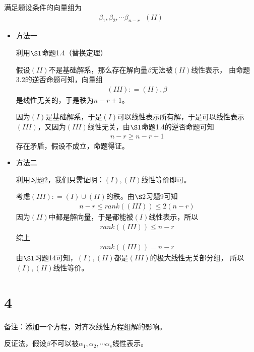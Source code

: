 \documentclass{article}
\begin{document}
满足题设条件的向量组为
\begin{align*}
  \beta_1, \beta_2, \cdots \beta_{n - r} \ \ \ (II)
\end{align*}

\begin{itemize}
  \item 方法一

        利用$\S 1$命题1.4（替换定理）

        假设$(II)$不是基础解系，那么存在解向量$\beta$无法被$(II)$线性表示，
        由命题3.2的逆否命题可知，向量组
        \begin{align*}
          (III) : = (II), \beta
        \end{align*}
        是线性无关的，于是秩为$n - r + 1$。

        因为$(I)$是基础解系，于是$(I)$可以线性表示所有解，于是可以线性表示
        $(III)$，又因为$(III)$线性无关，由$\S 1$命题1.4的逆否命题可知
        \begin{align*}
          n - r \geq n - r + 1
        \end{align*}
        存在矛盾，假设不成立，命题得证。

  \item 方法二

        利用习题2，我们只需证明：$(I), (II)$线性等价即可。

        考虑$(III) : = (I) \cup (II)$的秩。由$\S 2$习题9可知
        \begin{align*}
          n - r \leq rank((III)) \leq 2(n - r)
        \end{align*}
        因为$(II)$中都是解向量，于是都能被$(I)$线性表示，所以
        \begin{align*}
          rank((III)) \leq n - r
        \end{align*}
        综上
        \begin{align*}
          rank((III)) = n - r
        \end{align*}
        由$\S1$习题14可知，$(I),(II)$都是$(III)$的极大线性无关部分组，
        所以$(I), (II)$线性等价。
\end{itemize}

\section*{4}

备注：添加一个方程，对齐次线性方程组解的影响。

反证法，假设$\beta$不可以被$\alpha_1, \alpha_2, \cdots \alpha_{s}$线性表示。
\end{document}
